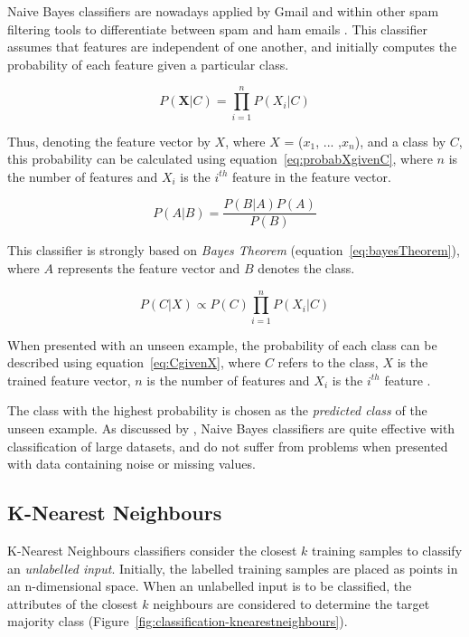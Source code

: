 Naive Bayes classifiers are nowadays applied by Gmail and within other spam filtering tools to differentiate between spam and ham emails \citep{kirk2017}. This classifier assumes that features are independent of one another, and initially computes the probability of each feature given a particular class. 

\begin{equation}
    \label{eq:probabXgivenC}
    P({\textbf{X}}|C) = \prod_{i=1}^{n} P(X_i|C)
\end{equation}

Thus, denoting the feature vector by $X$, where $X$ = ($x_1$, ... ,$x_n$), and a class by $C$, this probability can be calculated using equation~\ref{eq:probabXgivenC}, where $n$ is the number of features and $X_i$ is the $i^{th}$ feature in the feature vector.

\begin{equation}
    \label{eq:bayesTheorem}
    P(A|B) = \frac{P(B|A)P(A)}{P(B)}
\end{equation}

This classifier is strongly based on \textit{Bayes Theorem} (equation~\ref{eq:bayesTheorem}), where $A$ represents the feature vector and $B$ denotes the class.

\begin{equation}
    \label{eq:CgivenX}
    P(C|X) \propto P(C) \prod_{i=1}^{n} P(X_i|C)
\end{equation}

When presented with an unseen example, the probability of each class can be described using equation~\ref{eq:CgivenX}, where $C$ refers to the class, $X$ is the trained feature vector, $n$ is the number of features and $X_i$ is the $i^{th}$ feature \citep{rish2001}.

The class with the highest probability is chosen as the \textit{predicted class} of the unseen example. As discussed by \citet{russel2016}, Naive Bayes classifiers are quite effective with classification of large datasets, and do not suffer from problems when presented with data containing noise or missing values.

\subsection{K-Nearest Neighbours} 

K-Nearest Neighbours classifiers consider the closest $k$ training samples to classify an \textit{unlabelled input}. Initially, the labelled training samples are placed as points in an n-dimensional space. When an unlabelled input is to be classified, the attributes of the closest $k$ neighbours are considered to determine the target majority class (Figure~\ref{fig:classification-knearestneighbours}). 

